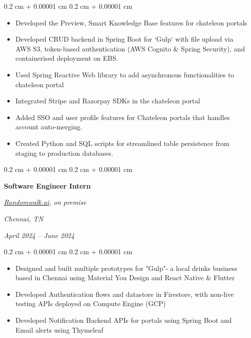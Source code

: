 \documentclass[10pt, letterpaper]{article}
\newenvironment{highlights}{
    \begin{itemize}[
        topsep=0.10 cm,
        parsep=0.10 cm,
        partopsep=0pt,
        itemsep=0pt,
        leftmargin=0.4 cm + 10pt
    ]
}{
    \end{itemize}
} %
\newenvironment{onecolentry}{
    \begin{adjustwidth}{
        0.2 cm + 0.00001 cm
    }{
        0.2 cm + 0.00001 cm
    }
}{
    \end{adjustwidth}
} %
\newenvironment{twocolentry}[2][]{
    \onecolentry
    \def\secondColumn{#2}
    \setcolumnwidth{\fill, 4.5 cm}
    \begin{paracol}{2}
}{
    \switchcolumn \raggedleft \secondColumn
    \end{paracol}
    \endonecolentry
} %
\let\hrefWithoutArrow\href
\renewcommand{\href}[2]{\hrefWithoutArrow{#1}{\ifthenelse{\equal{#2}{}}{ }{#2 }\raisebox{.15ex}{\footnotesize \faExternalLink*}}}
\begin{document}
\vspace{0.10 cm}
\begin{onecolentry}
    \begin{highlights}
        \item Developed the Preview, Smart Knowledge Base features for chateleon portals
        \item Developed CRUD backend in Spring Boot for `Gulp` with file upload via AWS S3,
        token-based authentication (AWS Cognito \& Spring Security), and containerised
        deployment on EBS.
        \item Used Spring Reactive Web library to add asynchronous functionalities to
        chateleon portal
        \item Integrated Stripe and Razorpay SDKs in the chateleon portal
        \item Added SSO and user profile features for Chateleon portals that handles account
        auto-merging.
        \item Created Python and SQL scripts for streamlined table persistence from staging
        to production databases.
    \end{highlights}
\end{onecolentry}

\vspace{0.2 cm}

\begin{twocolentry}{
        \textit{Chennai, TN}

        \textit{April 2024 – June 2024}}
    \textbf{Software Engineer Intern}

    \textit{{\hrefWithoutArrow{https://randomwalk.ai/}{\color{black}\hspace*{0.13cm}Randomwalk.ai}}, on premise}
\end{twocolentry}

\vspace{0.10 cm}
\begin{onecolentry}
    \begin{highlights}
        \item Designed and built multiple prototypes for "Gulp"- a local drinks business
        based in Chennai using Material You Design and React Native \& Flutter
        \item Developed Authentication flows and datastore in Firestore, with non-live
        testing APIs deployed on Compute Engine (GCP)
        \item Developed Notification Backend APIs for
        \textit{\href{https://chateleon.com}{Chateleon}} portals using Spring Boot and
        Email alerts using Thymeleaf
    \end{highlights}
\end{onecolentry}
\end{document}
